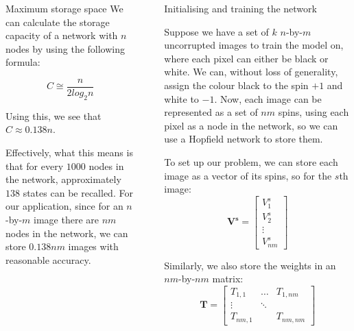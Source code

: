 \documentclass[25pt, a0paper, portrait]{beamer}
\newlength{\sepwidth}
\newlength{\colwidth}
\newcommand{\separatorcolumn}{\begin{column}{\sepwidth}\end{column}}
\begin{document}
\begin{frame}[t]
\begin{columns}[t]
\begin{column}{\colwidth}
\begin{block}{Maximum storage space}
    We can calculate the storage capacity of a network with $n$ nodes by using the following
    formula:

    \begin{equation} \label{recall_percentage}
      C \cong \frac{n}{2log_2n}
    \end{equation}

    Using this, we see that $C \approx 0.138n$. \cite{fncom:2017}

    Effectively, what this means is that for every $1000$ nodes in the network, approximately
    $138$ states can be recalled. For our application, since for an $n$-by-$m$ image there are
    $nm$ nodes in the network, we can store $0.138nm$ images with reasonable accuracy.


  \end{block}

\end{column}

\separatorcolumn

\begin{column}{\colwidth}

  \begin{block}{Initialising and training the network} \small

    Suppose we have a set of $k$ $n$-by-$m$ uncorrupted images to train the model on,
    where each pixel can either be black or white.
    We can, without loss of generality, assign the colour black to the spin $+1$
    and white to $-1$. Now, each image can be represented as a set of $nm$ spins, 
    using each pixel as a node in the network, so we can use a Hopfield network to 
    store them.

    To set up our problem, we can store each image as a vector of its spins, so for
    the $s$th image:
    \begin{equation*}
      \boldsymbol{V^s} = \begin{bmatrix}
        V^s_1 \\
        V^s_2 \\
        \vdots \\
        V^s_{nm}
      \end{bmatrix}
    \end{equation*}

    Similarly, we also store the weights in an $nm$-by-$nm$ matrix:
    \begin{equation*}
      \boldsymbol{T} = \begin{bmatrix}
        T_{1,1}   & \dots   & T_{1,nm}\\
        \vdots      & \ddots  & \\
        T_{nm,1}  &         & T_{nm,nm}
      \end{bmatrix}
    \end{equation*}


\end{block}
\end{column}
\end{columns}
\end{frame}
\end{document}
